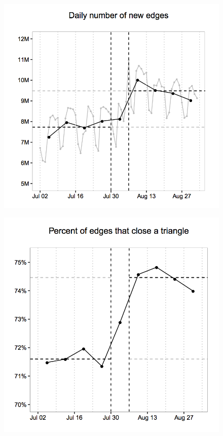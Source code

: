 \documentclass[aspectratio=169]{beamer}
\begin{document}
\begin{frame}

\begin{figure}
\centering
\includegraphics[height = \textheight]{figures/su_effect_2016_fig2}
\end{figure}

\end{frame}
\begin{frame}

\begin{figure}
\centering
\includegraphics[height = \textheight]{figures/su_effect_2016_fig10a}
\end{figure}

\end{frame}
\end{document}

